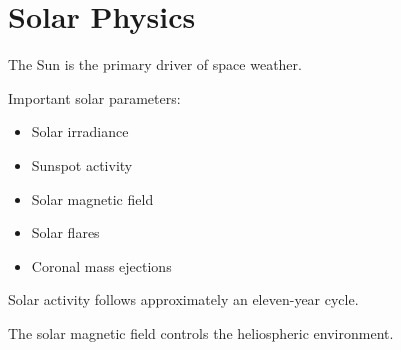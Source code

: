 \section{Solar Physics}


The Sun is the primary driver of space weather.



Important solar parameters:


\begin{itemize}

\item Solar irradiance

\item Sunspot activity

\item Solar magnetic field

\item Solar flares

\item Coronal mass ejections

\end{itemize}



Solar activity follows approximately an eleven-year cycle.


The solar magnetic field controls the heliospheric environment.

